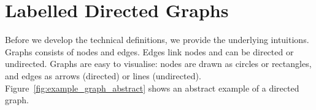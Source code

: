 %    
%    
%    
%

\section{Labelled Directed Graphs}
\label{sec:labelled_digraphs}

Before we develop the technical definitions,
we provide the underlying intuitions.
Graphs consists of nodes and edges. Edges link nodes and can be directed
or undirected. Graphs are easy to visualise: nodes are drawn as circles
or rectangles, and edges as arrows (directed) or lines (undirected).
Figure~\ref{fig:example_graph_abstract} shows an abstract example of a directed graph.


